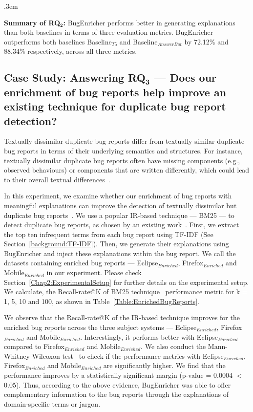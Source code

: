 \FrameSep.3em
\begin{frshaded}
	\noindent
	\textbf{Summary of RQ$\mathbf{_2}$:} BugEnricher performs better in generating explanations than both baselines in terms of three evaluation metrics. BugEnricher outperforms both baselines Baseline$_{T5}$ and Baseline$_{AnswerBot}$ by 72.12\% and 88.34\% respectively, across all three metrics.
\end{frshaded}

\subsection{ Case Study: Answering RQ$\mathbf{_3}$ --- Does our enrichment of bug reports help improve an existing technique for duplicate bug report detection?}\label{Chap2:RQ3}

Textually dissimilar duplicate bug reports differ from textually similar duplicate bug reports in terms of their underlying semantics and structures. For instance, textually dissimilar duplicate bug reports often have missing components (e.g., observed behaviours) or components that are written differently, which could lead to their overall textual differences~\cite{jahan2023towards}.\par

In this experiment, we examine whether our enrichment of bug reports with meaningful explanations can improve the detection of textually dissimilar but duplicate bug reports~\cite{jahan2023towards}. We use a popular IR-based technique --- BM25 --- to detect duplicate bug reports, as chosen by an existing work~\cite{jahan2023towards}. First, we extract the top ten infrequent terms from each bug report using TF-IDF (See Section~\ref{background:TF-IDF}). Then, we generate their explanations using BugEnricher and inject these explanations within the bug report. We call the datasets containing enriched bug reports --- Eclipse$_{Enriched}$, Firefox$_{Enriched}$ and Mobile$_{Enriched}$ in our experiment. Please check Section~\ref{Chap2:ExperimentalSetup} for further details on the experimental setup. We calculate, the Recall-rate@K of BM25 technique~\cite{yang2012duplication} performance metric for k = 1, 5, 10 and 100, as shown in Table~\ref{Table:EnrichedBugReports}.\par

We observe that the Recall-rate@K of the IR-based technique improves for the enriched bug reports across the three subject systems --- Eclipse$_{Enriched}$, Firefox$_{Enriched}$ and Mobile$_{Enriched}$. Interestingly, it performs better with Eclipse$_{Enriched}$ compared to Firefox$_{Enriched}$ and Mobile$_{Enriched}$. We also conduct the Mann-Whitney Wilcoxon test~\cite{cuzick1985wilcoxon} to check if the performance metrics with Eclipse$_{Enriched}$, Firefox$_{Enriched}$ and Mobile$_{Enriched}$ are significantly higher. We find that the performance improves by a statistically significant margin (p-value = 0.0004 $<$ 0.05). Thus, according to the above evidence, BugEnricher was able to offer complementary information to the bug reports through the explanations of domain-specific terms or jargon.

